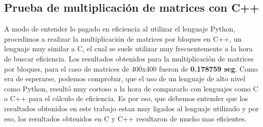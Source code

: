 \subsection{Prueba de multiplicación de matrices con C++}
    A modo de entender lo pagado en eficiencia al utilizar el lenguaje Python, 
    procedimos a realizar la multiplicación de matrices por bloques en C++, un lenguaje
    muy similar a C, el cual se suele utilizar muy frecuentemente a la hora de buscar
    eficiencia.
    Los resultados obtenidos para la multiplicación de matrices por bloques, para el caso
    de matrices de 400x400 fueron de \textbf{0.178759 seg}. Como era de esperarse, podemos 
    comprobar, que el uso de un lenguaje de alto nivel como Python, resultó muy costoso a
    la hora de compararlo con lenguajes como C o C++ para el cálculo de eficiencia.
    Es por eso, que debemos entender que los resultados obtenidos en este trabajo estan
    muy ligados al lenguaje utilizado y por eso, los resultados obtenidos en C y C++ resultaron
    de mucho mas eficientes.
